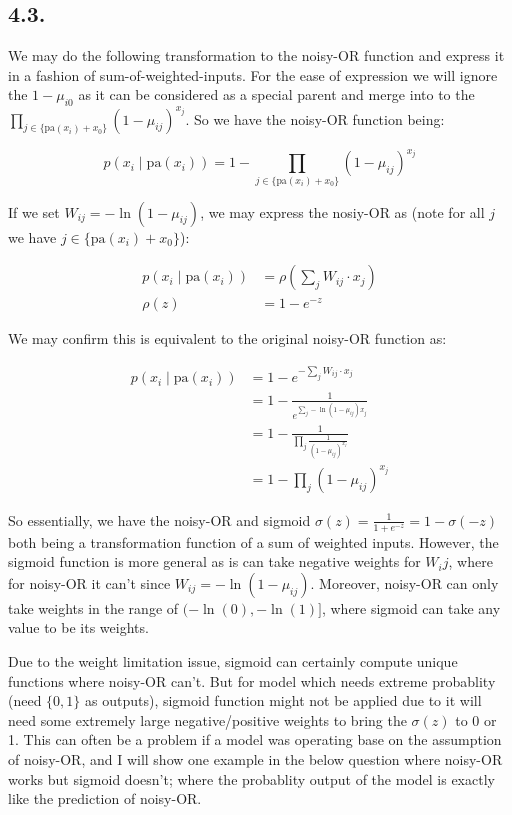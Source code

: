 \documentclass[11pt]{article}
\begin{document}
\subsection*{4.3.}

We may do the following transformation to the noisy-OR function and express it in a fashion of sum-of-weighted-inputs. For the ease of expression we will ignore the $1 - \mu_{i0}$ as it can be considered as a special parent and merge into to the $\prod_{j \in \{ \textrm{pa}(x_i) + x_0 \}}(1 - \mu_{ij})^{x_j}$. So we have the noisy-OR function being:

\begin{equation*}
    p(x_i \mid \textrm{pa}({x_i})) = 1 - \prod_{j \in \{ \textrm{pa}(x_i) + x_0 \}} (1 - \mu_{ij})^{x_j}
\end{equation*}

If we set $W_{ij} = - \ln(1 - \mu_{ij})$, we may express the nosiy-OR as (note for all $j$ we have $j \in \{ \textrm{pa}(x_i) + x_0 \}$):

\begin{align*}
    p(x_i \mid \textrm{pa}({x_i})) &= \rho (\sum_j W_{ij} \cdot x_{j}) \\
    \rho(z) &= 1 - e^{-z}
\end{align*}

We may confirm this is equivalent to the original noisy-OR function as:

\begin{align*}
    p(x_i \mid \textrm{pa}({x_i})) &= 1 - e^{-\sum_j W_{ij} \cdot x_{j}} \\
    &=1 - \frac{1}{e^{\sum_j -\ln(1 - \mu_{ij}) x_j}} \\
    &= 1 - \frac{1}{\prod_j \frac{1}{(1 - \mu_{ij}) ^ {x_j}}} \\
    &= 1 - \prod_j (1 - \mu_{ij})^{x_j}
\end{align*}

So essentially, we have the noisy-OR and sigmoid $\sigma(z) = \frac{1}{1 + e^{-z}} = 1 - \sigma(-z)$ both being a transformation function of a sum of weighted inputs. However, the sigmoid function is more general as is can take negative weights for $W_ij$, where for noisy-OR it can't since $W_{ij} = - \ln(1 - \mu_{ij})$. Moreover, noisy-OR can only take weights in the range of $(-\ln(0), -\ln(1)]$, where sigmoid can take any value to be its weights.

Due to the weight limitation issue, sigmoid can certainly compute unique functions where noisy-OR can't. But for model which needs extreme probablity (need $\{0, 1 \}$ as outputs), sigmoid function might not be applied due to it will need some extremely large negative/positive weights to bring the $\sigma(z)$ to 0 or 1. This can often be a problem if a model was operating base on the assumption of noisy-OR, and I will show one example in the below question where noisy-OR works but sigmoid doesn't; where the probablity output of the model is exactly like the prediction of noisy-OR.
\end{document}
